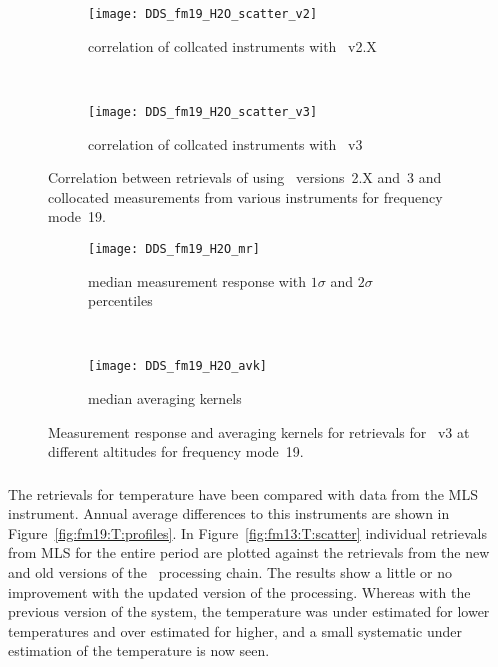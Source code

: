 \begin{figure}[htpb]
    \centering
    \begin{subfigure}[b]{0.49\textwidth}
        \texttt{[image: DDS\_fm19\_H2O\_scatter\_v2]}
        \caption{correlation of collcated instruments with \smr~v2.X}
        \label{fig:fm19:H2O:scatter:v2}
    \end{subfigure}
    \,
    \begin{subfigure}[b]{0.49\textwidth}
        \texttt{[image: DDS\_fm19\_H2O\_scatter\_v3]}
        \caption{correlation of collcated instruments with \smr~v3}
        \label{fig:fm19:H2O:scatter:v3}
    \end{subfigure}
    \caption{Correlation between retrievals of  using \smr\
    versions~2.X and~3 and collocated measurements from various instruments
    for frequency mode~19.}
    \label{fig:fm19:H2O:scatter}
\end{figure}

\begin{figure}[htpb]
    \centering
    \begin{subfigure}[b]{0.49\textwidth}
        \texttt{[image: DDS\_fm19\_H2O\_mr]}
        \caption{median measurement response with $1\sigma$ and $2\sigma$
        percentiles}
        \label{fig:fm19:H2O:mr}
    \end{subfigure}
    \,
    \begin{subfigure}[b]{0.49\textwidth}
        \texttt{[image: DDS\_fm19\_H2O\_avk]}
        \caption{median averaging kernels\newline~}
        \label{fig:fm19:H2O:avk}
    \end{subfigure}
    \caption{Measurement response and averaging kernels for 
    retrievals for \smr~v3 at different altitudes for frequency mode~19.}
    \label{fig:fm19:H2O:mr_avk}
\end{figure}



\subsubsection{}
\label{sec:fm19:comparison:temperature}
The retrievals for temperature have been compared with data from the MLS
instrument. Annual average differences to this instruments are shown in
Figure~\ref{fig:fm19:T:profiles}. In Figure~\ref{fig:fm13:T:scatter} individual
retrievals from MLS for the entire period are plotted against the retrievals
from the new and old versions of the \smr\ processing chain. The results show a
little or no improvement with the updated version of the processing. Whereas
with the previous version of the system, the temperature was under estimated
for lower temperatures and over estimated for higher, and a small systematic
under estimation of the temperature is now seen.


